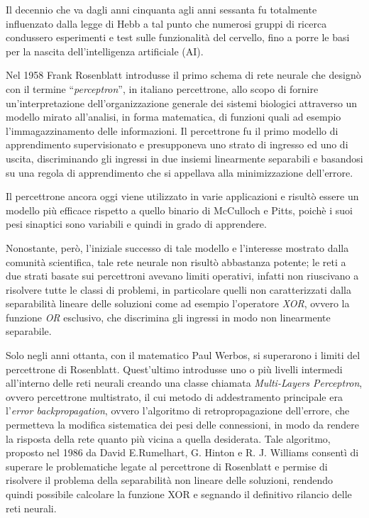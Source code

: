 \documentclass[12pt,a4paper,oneside]{book}
\begin{document}
	    Il decennio che va dagli anni cinquanta agli anni sessanta fu totalmente influenzato dalla legge di Hebb a tal punto che numerosi gruppi di ricerca condussero esperimenti e test sulle funzionalità del cervello, fino a porre le basi per la nascita dell'intelligenza artificiale (AI).
	
		Nel 1958 Frank Rosenblatt introdusse il primo schema di rete neurale che designò con il termine ``\emph{perceptron}'', in italiano percettrone, allo scopo di fornire un'interpretazione dell'organizzazione generale dei sistemi biologici attraverso un modello mirato all'analisi, in forma matematica, di funzioni quali ad esempio l'immagazzinamento delle informazioni. Il percettrone fu il primo modello di apprendimento supervisionato e presupponeva uno strato di ingresso ed uno di uscita, discriminando gli ingressi in due insiemi linearmente separabili e basandosi su una regola di apprendimento che si appellava alla minimizzazione dell'errore.
		
		Il percettrone ancora oggi viene utilizzato in varie applicazioni e risultò essere un modello più efficace rispetto a quello binario di McCulloch e Pitts, poichè i suoi pesi sinaptici sono variabili e quindi in grado di apprendere.
		
		Nonostante, però, l'iniziale successo di tale modello e l'interesse mostrato dalla comunità scientifica, tale rete neurale non risultò abbastanza potente; le reti a due strati basate sui percettroni avevano limiti operativi, infatti non riuscivano a risolvere tutte le classi di problemi, in particolare quelli non caratterizzati dalla separabilità lineare delle soluzioni come ad esempio l'operatore \emph{XOR}, ovvero la funzione \emph{OR} esclusivo, che discrimina gli ingressi in modo non linearmente separabile.
		
		Solo negli anni ottanta, con il matematico Paul Werbos, si superarono i limiti del percettrone di Rosenblatt.  Quest'ultimo introdusse uno o più livelli intermedi all'interno delle reti neurali creando una classe chiamata  \emph{Multi-Layers Perceptron}, ovvero percettrone multistrato, il cui metodo di addestramento principale era l'\emph{error backpropagation}, ovvero l'algoritmo di retropropagazione dell'errore, che permetteva la modifica sistematica dei pesi delle connessioni, in modo da rendere la risposta della rete quanto più vicina a quella desiderata.
		Tale algoritmo, proposto nel 1986 da David E.Rumelhart, G. Hinton e R. J. Williams consentì di superare le problematiche legate al percettrone di Rosenblatt e permise di risolvere il problema della separabilità non lineare delle soluzioni, rendendo quindi possibile calcolare la funzione XOR e segnando il definitivo rilancio delle reti neurali.
		
\end{document}
